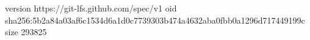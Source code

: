 version https://git-lfs.github.com/spec/v1
oid sha256:5b2a84a03af6c1534d6a1d0c7739303b474a4632aba0fbb0a1296d717449199c
size 293825
